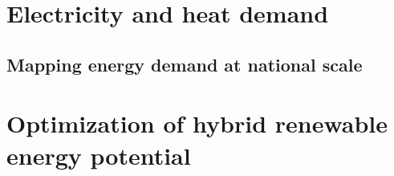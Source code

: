 \chapter{Electricity and heat demand}
\label{demand_chapter}

\section{Mapping energy demand at national scale}

\chapter{Optimization of hybrid renewable energy potential}
\label{hybrid_chapter}
